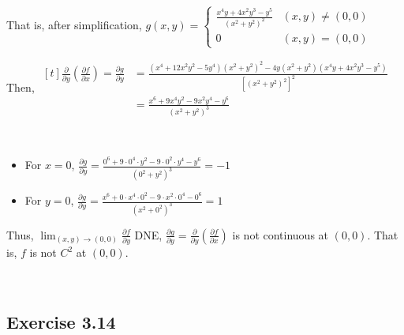 \documentclass[11pt,fleqn]{book} %
\begin{document}
That is, after simplification, $g(x,y) = 
    \begin{cases}
        \frac{x^4y + 4x^2y^3 - y^5}{(x^2 + y^2)^2} & (x,y) \neq (0,0) \\
        0                                          & (x,y) = (0,0)
    \end{cases}$

Then, 
$\begin{aligned}[t]
    \frac{\partial}{\partial y} \left(\frac{\partial f}{\partial x}\right) = \frac{\partial g}{\partial y}
     & = \frac{(x^4 + 12x^2y^2 - 5y^4)(x^2 + y^2)^2 - 4y(x^2 + y^2)(x^4y + 4x^2y^3 - y^5)}{\left[(x^2 + y^2)^2\right]^2} \\
     & = \frac{x^6 + 9x^4y^2 - 9x^2y^4 - y^6}{(x^2 + y^2)^3}
\end{aligned}$

{~~~}

\begin{itemize}
    \item For $x = 0$, $\frac{\partial g}{\partial y} = \frac{0^6 + 9 \cdot 0^4 \cdot y^2 - 9 \cdot 0^2 \cdot y^4 - y^6}{(0^2 + y^2)^3} = -1$

    \item For $y = 0$, $\frac{\partial g}{\partial y} = \frac{x^6 + 0 \cdot x^4 \cdot 0^2 - 9 \cdot x^2 \cdot 0^4 - 0^6}{(x^2 + 0^2)^3} = 1$
\end{itemize}

Thus, $\lim_{(x,y)\to(0,0)} \frac{\partial f}{\partial y}$ DNE, $\frac{\partial g}{\partial y} = \frac{\partial}{\partial y}\left( \frac{\partial f}{\partial x} \right)$ is not continuous at $(0,0)$. That is, $f$ is not $C^2$ at $(0,0)$. 

{~~~}

\subsection*{Exercise 3.14}
\end{document}
